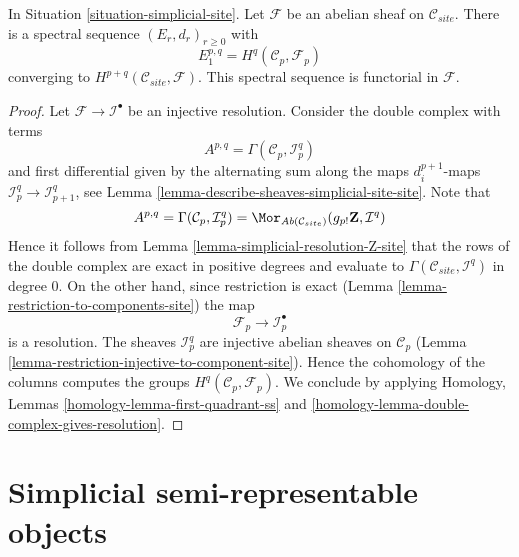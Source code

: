 \begin{lemma}
\label{lemma-simplicial-sheaf-cohomology-site}
In Situation \ref{situation-simplicial-site}. Let $\mathcal{F}$ be an abelian
sheaf on $\mathcal{C}_{site}$. There is a spectral sequence
$(E_r, d_r)_{r \geq 0}$ with
$$
E_1^{p, q} = H^q(\mathcal{C}_p, \mathcal{F}_p)
$$
converging to $H^{p + q}(\mathcal{C}_{site}, \mathcal{F})$.
This spectral sequence is functorial in $\mathcal{F}$.
\end{lemma}

\begin{proof}
Let $\mathcal{F} \to \mathcal{I}^\bullet$ be an injective resolution.
Consider the double complex with terms
$$
A^{p, q} = \Gamma(\mathcal{C}_p, \mathcal{I}^q_p)
$$
and first differential given by the alternating sum along the maps
$d^{p + 1}_i$-maps $\mathcal{I}_p^q \to \mathcal{I}_{p + 1}^q$, see
Lemma \ref{lemma-describe-sheaves-simplicial-site-site}. Note that
$$
A^{p, q} = \Gamma(\mathcal{C}_p, \mathcal{I}_p^q) =
\Mor_{\textit{Ab}(\mathcal{C}_{site})}(g_{p!}\mathbf{Z}, \mathcal{I}^q)
$$
Hence it follows from Lemma \ref{lemma-simplicial-resolution-Z-site}
that the rows of the double complex are exact in positive degrees
and evaluate to $\Gamma(\mathcal{C}_{site}, \mathcal{I}^q)$ in degree $0$.
On the other hand, since restriction is exact
(Lemma \ref{lemma-restriction-to-components-site})
the map
$$
\mathcal{F}_p \to \mathcal{I}_p^\bullet
$$
is a resolution. The sheaves $\mathcal{I}_p^q$ are injective
abelian sheaves on $\mathcal{C}_p$
(Lemma \ref{lemma-restriction-injective-to-component-site}).
Hence the cohomology of the columns computes the groups
$H^q(\mathcal{C}_p, \mathcal{F}_p)$. We conclude by applying
Homology, Lemmas \ref{homology-lemma-first-quadrant-ss} and
\ref{homology-lemma-double-complex-gives-resolution}.
\end{proof}







\section{Simplicial semi-representable objects}
\label{section-semi-representable}

